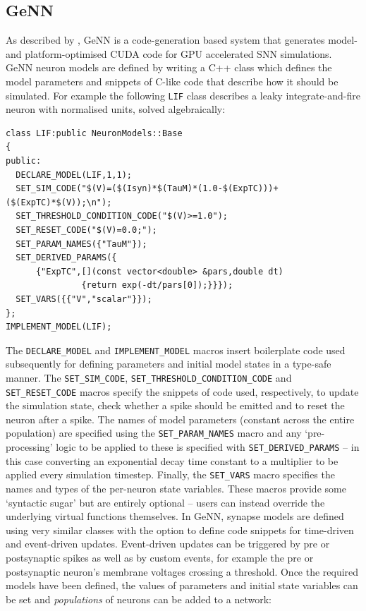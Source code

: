 \documentclass[utf8]{frontiersSCNS} %
\begin{document}
\subsection{GeNN}
\label{sec:method/genn}
As described by \citet{Yavuz2016}, GeNN is a code-generation based system that generates model- and platform-optimised CUDA code for GPU accelerated SNN simulations.
GeNN neuron models are defined by writing a C++ class which defines the model parameters and snippets of C-like code that describe how it should be simulated.
For example the following \lstinline{LIF} class describes a leaky integrate-and-fire neuron with normalised units, solved algebraically:
%
\begin{lstlisting}
class LIF:public NeuronModels::Base
{
public:
  DECLARE_MODEL(LIF,1,1);
  SET_SIM_CODE("$(V)=($(Isyn)*$(TauM)*(1.0-$(ExpTC)))+($(ExpTC)*$(V));\n");
  SET_THRESHOLD_CONDITION_CODE("$(V)>=1.0");
  SET_RESET_CODE("$(V)=0.0;");
  SET_PARAM_NAMES({"TauM"});
  SET_DERIVED_PARAMS({
      {"ExpTC",[](const vector<double> &pars,double dt)
               {return exp(-dt/pars[0]);}}});
  SET_VARS({{"V","scalar"}});
};
IMPLEMENT_MODEL(LIF);
\end{lstlisting}
%
The \lstinline{DECLARE_MODEL} and \lstinline{IMPLEMENT_MODEL} macros insert boilerplate code used subsequently for defining parameters and initial model states in a type-safe manner.
The \lstinline{SET_SIM_CODE}, \lstinline{SET_THRESHOLD_CONDITION_CODE} and \lstinline{SET_RESET_CODE} macros specify the snippets of code used, respectively, to update the simulation state, check whether a spike should be emitted and to reset the neuron after a spike.
The names of model parameters (constant across the entire population) are specified using the \lstinline{SET_PARAM_NAMES} macro and any `pre-processing' logic to be applied to these is specified with \lstinline{SET_DERIVED_PARAMS} -- in this case converting an exponential decay time constant to a multiplier to be applied every simulation timestep.
Finally, the \lstinline{SET_VARS} macro specifies the names and types of the per-neuron state variables.
These macros provide some `syntactic sugar' but are entirely optional -- users can instead override the underlying virtual functions themselves.
In GeNN, synapse models are defined using very similar classes with the option to define code snippets for time-driven and event-driven updates.
Event-driven updates can be triggered by pre or postsynaptic spikes as well as by custom events, for example the pre or postsynaptic neuron's membrane voltages crossing a threshold.
Once the required models have been defined, the values of parameters and initial state variables can be set and \textit{populations} of neurons can be added to a network:
\end{document}
